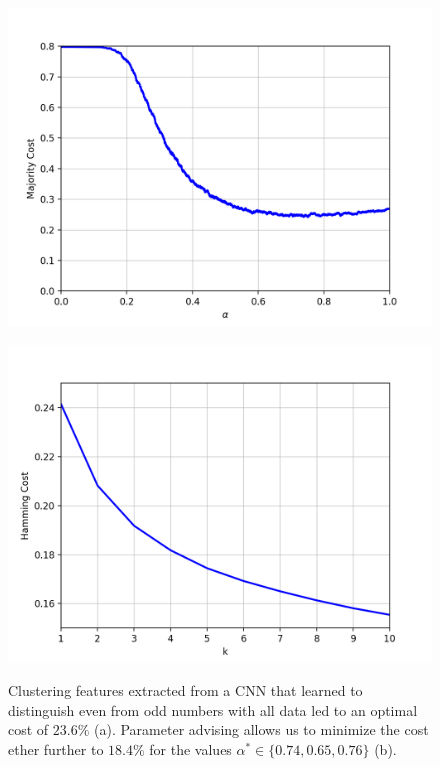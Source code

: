 \begin{figure}[h]
\begin{minipage}{.45\textwidth}
  \centering
  {\includegraphics[width=\linewidth]{plots/mnist-cnn-even-odd-random-sc}}
\end{minipage}\quad
\begin{minipage}{.45\textwidth}
  \centering
  {\includegraphics[width=\linewidth]{plots/mnist-cnn-even-odd-random-sc-top10}}
\end{minipage}
\caption{%
  Clustering features extracted from a CNN that learned to distinguish even from odd numbers with all data led to an optimal cost of $23.6\%$ (a). Parameter advising allows us to minimize the cost ether further to $18.4\%$ for the values $\alpha^* \in \{0.74, 0.65, 0.76\}$ (b).}
\label{fig:mnist_cnn_even_odd}
\end{figure}

